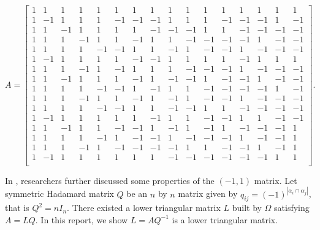 \documentclass[11pt]{article}
\begin{document}
$$A = 
\left[\begin{smallmatrix}
    1 & 1 & 1 & 1 & 1 & 1 & 1 & 1 & 1 & 1 & 1 & 1 & 1 & 1 & 1 & 1 \\
    1 & -1 & 1  & 1  & 1  & -1 & -1 & -1 & 1  & 1  & 1  & -1 & -1 & -1 & 1  & -1 \\
    1 & 1  & -1 & 1  & 1  & 1  & 1  & -1 & -1 & -1 & 1  & 1  & -1 & -1 & -1 & -1 \\
    1 & 1  & 1  & -1 & 1  & 1  & -1 & 1  & 1  & -1 & -1 & -1 & -1 & 1  & -1 & -1 \\
    1 & 1  & 1  & 1  & -1 & -1 & 1  & 1  & -1 & 1  & -1 & -1 & 1  & -1 & -1 & -1 \\
    1 & -1 & 1  & 1  & 1  & 1  & -1 & -1 & 1  & 1  & 1  & 1  & -1 & 1  & 1  & 1  \\
    1 & 1  & 1  & -1 & 1  & -1 & 1  & 1  & 1  & -1 & -1 & -1 & 1  & -1 & -1 & -1 \\
    1 & 1  & -1 & 1  & 1  & 1  & -1 & 1  & -1 & -1 & 1  & -1 & -1 & 1  & -1 & -1 \\
    1 & 1  & 1  & 1  & -1 & -1 & 1  & -1 & 1  & 1  & -1 & -1 & -1 & -1 & 1  & -1 \\
    1 & 1  & 1  & -1 & 1  & 1  & -1 & 1  & -1 & 1  & -1 & -1 & 1  & -1 & -1 & -1 \\
    1 & 1  & 1  & 1  & -1 & -1 & 1  & 1  & -1 & -1 & 1  & 1  & -1 & -1 & -1 & -1 \\
    1 & -1 & 1  & 1  & 1  & 1  & 1  & -1 & 1  & 1  & -1 & -1 & 1  & 1  & -1 & -1 \\
    1 & 1  & -1 & 1  & 1  & -1 & -1 & 1  & -1 & 1  & -1 & 1  & -1 & -1 & -1 & 1  \\
    1 & 1  & 1  & 1  & -1 & 1  & -1 & -1 & 1  & -1 & -1 & -1 & 1  & -1 & -1 & 1  \\
    1 & 1  & 1  & -1 & 1  & -1 & -1 & -1 & -1 & 1  & 1  & -1 & -1 & 1  & -1 & 1  \\
    1 & -1 & 1  & 1  & 1  & 1  & 1  & 1  & -1 & -1 & -1 & -1 & -1 & -1 & 1  & 1  \\
\end{smallmatrix}\right].
$$

In \cite{ALON1997133}, researchers further discussed some properties of the $(-1, 1)$ matrix. Let symmetric Hadamard matrix $Q$ be an $n$ by $n$ matrix given by $q_{ij} = (-1)^{|\alpha_i\cap\alpha_j|}$, that is $Q^2 = nI_n$. There existed a lower triangular matrix $L$ built by $\Omega$ satisfying $A=LQ$. In this report, we show $L = AQ^{-1}$ is a lower triangular matrix.
\end{document}
